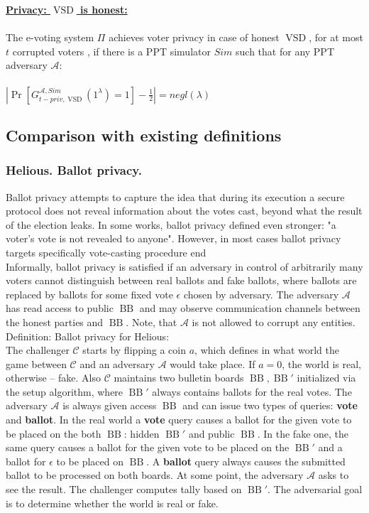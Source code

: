\documentclass[12pt]{article}
\DeclareMathOperator{\vsd}{VSD}
\DeclareMathOperator{\bb}{BB}
\begin{document}
\underline{\textbf{Privacy: $\vsd$ is honest:}}\\\\
The e-voting system $\Pi$ achieves voter privacy in case of honest $\vsd$, for at most $t$ corrupted voters , if there is a PPT simulator $Sim$ such that for any PPT adversary $\mathcal{A}$:\\\\
 $|\Pr[G_{t-priv,\vsd}^{\mathcal{A},Sim}(1^{\lambda}) = 1] - \frac{1}{2}| = negl(\lambda)$
 \subsection{Comparison with existing definitions}
 \subsubsection{Helious. Ballot privacy.}
 Ballot privacy attempts to capture the idea that during its execution a secure protocol does not reveal information about the votes cast, beyond what the result of the election leaks. In some works, ballot privacy defined even stronger: "a voter's vote is not revealed to anyone". However, in most cases ballot privacy targets specifically vote-casting procedure end \\ 
  
Informally, ballot privacy is satisfied if an adversary in control of arbitrarily many voters cannot distinguish between real ballots and fake ballots, where ballots are replaced by ballots for some fixed vote $\epsilon$ chosen by adversary. The adversary $\mathcal{A}$ has read access to public $\bb$ and may observe communication channels between the honest parties and $\bb$. Note, that $\mathcal{A}$  is not allowed to corrupt any entities. \\

Definition: Ballot privacy for Helious:\\
The challenger $\mathcal{C}$ starts by flipping a coin $a$, which defines in what world the game between $\mathcal{C}$ and an adversary  $\mathcal{A}$ would take place.  If $a=0$, the world is real, otherwise -- fake. Also $\mathcal{C}$  maintains two bulletin boards $\bb,\bb'$ initialized via the setup algorithm, where $\bb'$ always contains ballots for the real votes.  The adversary $\mathcal{A}$ is always given access $\bb$ and can issue two types of queries: \textbf{vote} and \textbf{ballot}.  In the real world a \textbf{vote} query causes a ballot for the given vote to be placed on the both $\bb$: hidden $\bb'$ and public $\bb$. In the fake one, the same query causes a ballot for the given vote to be placed on the $\bb'$ and a ballot for $\epsilon$  to be placed on $\bb$. A \textbf{ballot} query always causes the submitted ballot to be processed on both boards. At some point, the adversary $\mathcal{A}$ asks to see the result. The challenger computes tally based on $\bb'$. The adversarial goal is to determine whether the world is real or fake.\\
\end{document}
